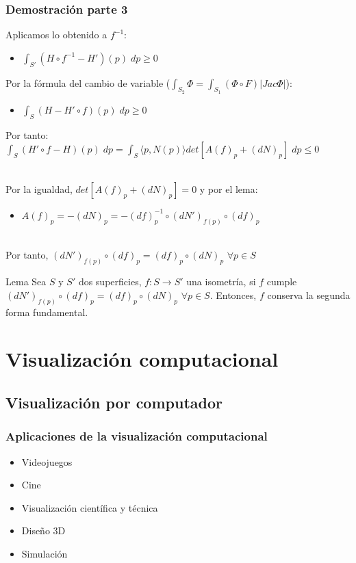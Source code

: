 \documentclass{beamer}
\begin{document}
	\begin{frame}
		\frametitle{Demostración parte 3}
		
		Aplicamos lo obtenido a $f^{-1}$:
		\begin{itemize}
			\item $\int_{S'} (H \circ f^{-1} - H')(p) \; dp \geq 0$
		\end{itemize}
		Por la fórmula del cambio de variable ($\int_{S_2} \Phi = \int_{S_1} (\Phi \circ F)|Jac \Phi|$):
		\begin{itemize}
			\item $\int_S (H - H' \circ f) (p) \; dp \geq 0$
		\end{itemize}
		
		Por tanto:
		$\int_S (H' \circ f - H)(p) \; dp = \int_S \langle p, N(p) \rangle det[A(f)_p + (dN)_p] \; dp \leq 0$
		
		${ }$\\
		
		Por la igualdad, $det[A(f)_p + (dN)_p]=0$ y por el lema:
		\begin{itemize}
			\item $A(f)_p = -(dN)_p = -(df)^{-1}_{p} \circ (dN')_{f(p)} \circ (df)_p$
		\end{itemize}
		
		
		${ }$\\
		
		Por tanto, $(dN')_{f(p)} \circ (df)_p = (df)_p \circ (dN)_p$ $\forall p \in S$
		
		\begin{block}{Lema}
			Sea $S$ y $S'$ dos superficies, $f: S \to S'$ una isometría, si $f$ cumple $(dN')_{f(p)} \circ (df)_p = (df)_p \circ (dN)_p$ $\forall p \in S$. Entonces, $f$ conserva la segunda forma fundamental.
		\end{block}

		
	\end{frame}


	

	
	
	\section{Visualización computacional}
	\subsection{Visualización por computador}
	
	\begin{frame}
		\frametitle{Aplicaciones de la visualización computacional}
		\begin{itemize}
			\item Videojuegos
			\item Cine
			\item Visualización científica y técnica
			\item Diseño 3D
			\item Simulación
		\end{itemize}
	\end{frame}
	
\end{document}
